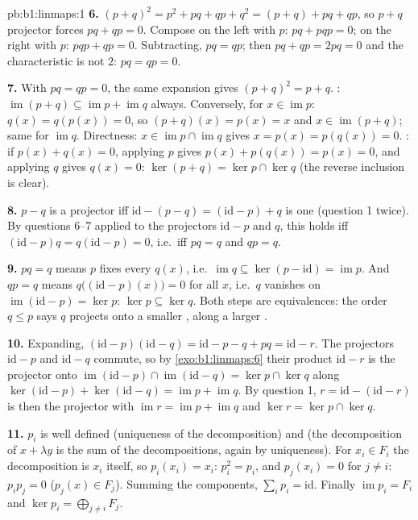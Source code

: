 \begin{solution}{pb:b1:linmaps:1}
\textbf{6.} $(p + q)^2 = p^2 + pq + qp + q^2 = (p + q) + pq +
qp$, so $p + q$ projector forces $pq + qp = 0$. Compose on the
left with $p$: $pq + pqp = 0$; on the right with $p$: $pqp + qp
= 0$. Subtracting, $pq = qp$; then $pq + qp = 2pq = 0$ and the
characteristic is not $2$: $pq = qp = 0$.

\textbf{7.} With $pq = qp = 0$, the same expansion gives $(p +
q)^2 = p + q$. : $\operatorname{im}(p + q) \subseteq
\operatorname{im} p + \operatorname{im} q$ always. Conversely,
for $x \in \operatorname{im} p$: $q(x) = q(p(x)) = 0$, so $(p +
q)(x) = p(x) = x$ and $x \in \operatorname{im}(p+q)$; same for
$\operatorname{im} q$. Directness: $x \in \operatorname{im} p
\cap \operatorname{im} q$ gives $x = p(x) = p(q(x)) = 0$.
: if $p(x) + q(x) = 0$, applying $p$ gives $p(x) +
p(q(x)) = p(x) = 0$, and applying $q$ gives $q(x) = 0$: $\ker(p
+ q) = \ker p \cap \ker q$ (the reverse inclusion is clear).

\textbf{8.} $p - q$ is a projector iff $\mathrm{id} - (p - q) =
(\mathrm{id} - p) + q$ is one (question 1 twice). By questions
6--7 applied to the projectors $\mathrm{id} - p$ and $q$, this
holds iff $(\mathrm{id} - p)q = q(\mathrm{id} - p) = 0$, i.e.\
iff $pq = q$ and $qp = q$.

\textbf{9.} $pq = q$ means $p$ fixes every $q(x)$, i.e.\
$\operatorname{im} q \subseteq \ker(p - \mathrm{id}) =
\operatorname{im} p$. And $qp = q$ means $q\bigl((\mathrm{id} -
p)(x)\bigr) = 0$ for all $x$, i.e.\ $q$ vanishes on
$\operatorname{im}(\mathrm{id} - p) = \ker p$: $\ker p \subseteq
\ker q$. Both steps are equivalences: the order $q \leq p$ says
$q$ projects onto a smaller \omterm{def:b1:linmaps:kerim}{image}, along a larger .

\textbf{10.} Expanding, $(\mathrm{id} - p)(\mathrm{id} - q) =
\mathrm{id} - p - q + pq = \mathrm{id} - r$. The projectors
$\mathrm{id} - p$ and $\mathrm{id} - q$ commute, so by
\cref{exo:b1:linmaps:6} their product $\mathrm{id} - r$ is the
projector onto $\operatorname{im}(\mathrm{id} - p) \cap
\operatorname{im}(\mathrm{id} - q) = \ker p \cap \ker q$ along
$\ker(\mathrm{id} - p) + \ker(\mathrm{id} - q) =
\operatorname{im} p + \operatorname{im} q$. By question 1, $r =
\mathrm{id} - (\mathrm{id} - r)$ is then the projector with
$\operatorname{im} r = \operatorname{im} p + \operatorname{im}
q$ and $\ker r = \ker p \cap \ker q$.

\textbf{11.} $p_i$ is well defined (uniqueness of the
decomposition) and  (the decomposition of $x + \lambda y$
is the sum of the decompositions, again by uniqueness). For $x_i
\in F_i$ the decomposition is $x_i$ itself, so $p_i(x_i) = x_i$:
$p_i^2 = p_i$, and $p_j(x_i) = 0$ for $j \neq i$: $p_i p_j = 0$
($p_j(x) \in F_j$). Summing the components, $\sum_i p_i =
\mathrm{id}$. Finally $\operatorname{im} p_i = F_i$ and $\ker
p_i = \bigoplus_{j \neq i} F_j$.


\end{solution}
